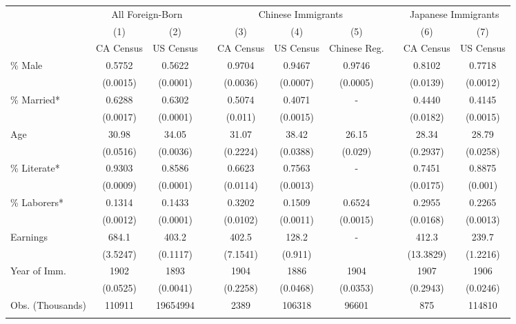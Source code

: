 \begin{tabular}{lccccccccc}
\hhline{==========}
& \multicolumn{2}{c}{All Foreign-Born} & & \multicolumn{3}{c}{Chinese Immigrants} & & \multicolumn{2}{c}{Japanese Immigrants} \\ 
\hhline{~--~---~--}
& (1) & (2) & & (3) & (4) & (5) & & (6) & (7) \\ 
& CA Census & US Census & & CA Census & US Census & Chinese Reg. & & CA Census & US Census \\ 
 \hhline{----------}
\% Male & 0.5752&0.5622&&0.9704&0.9467&0.9746&&0.8102&0.7718 \\ 
& (0.0015)&(0.0001)&&(0.0036)&(0.0007)&(0.0005)&&(0.0139)&(0.0012) \\ 
\% Married* & 0.6288&0.6302&&0.5074&0.4071&-&&0.4440&0.4145 \\ 
& (0.0017)&(0.0001)&&(0.011)&(0.0015)&&&(0.0182)&(0.0015) \\ 
Age & 30.98&34.05&&31.07&38.42&26.15&&28.34&28.79 \\ 
& (0.0516)&(0.0036)&&(0.2224)&(0.0388)&(0.029)&&(0.2937)&(0.0258) \\ 
\% Literate* & 0.9303&0.8586&&0.6623&0.7563&-&&0.7451&0.8875 \\ 
& (0.0009)&(0.0001)&&(0.0114)&(0.0013)&&&(0.0175)&(0.001) \\ 
\% Laborers* & 0.1314&0.1433&&0.3202&0.1509&0.6524&&0.2955&0.2265 \\ 
& (0.0012)&(0.0001)&&(0.0102)&(0.0011)&(0.0015)&&(0.0168)&(0.0013) \\ 
Earnings & 684.1&403.2&&402.5&128.2&-&&412.3&239.7 \\ 
& (3.5247)&(0.1117)&&(7.1541)&(0.911)&&&(13.3829)&(1.2216) \\ 
Year of Imm. & 1902&1893&&1904&1886&1904&&1907&1906 \\ 
& (0.0525)&(0.0041)&&(0.2258)&(0.0468)&(0.0353)&&(0.2943)&(0.0246) \\ 
Obs. (Thousands)
&
110911&19654994&&2389&106318&96601&&875&114810
\\ 
\hhline{----------}
\end{tabular}
